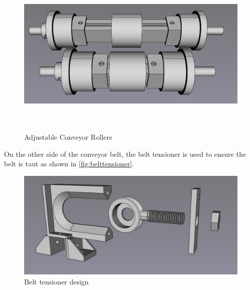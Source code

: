 \begin{figure}[H]
    \begin{minipage}[h]{\textwidth}
        \centering
        \includegraphics[height=8cm]{imgs/freecad/adjustablerollers.jpg}
        \caption{Adjustable Conveyor Rollers}
        \label{fig:adjustablerollers}
    \end{minipage}
\end{figure}

On the other side of the conveyor belt, the belt tensioner is used to ensure the belt is taut as shown in \autoref{fig:belttensioner}.

\begin{figure}[H]
    \begin{minipage}[h]{0.95\textwidth}
        \centering
        \includegraphics[width=\textwidth]{imgs/freecad/belttensioner.jpg}
        \caption{Belt tensioner design}
        \label{fig:belttensioner}
    \end{minipage}
\end{figure}


